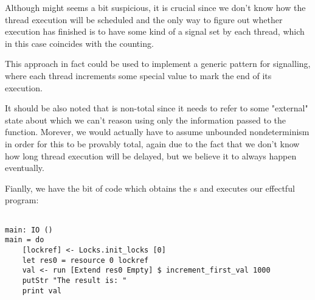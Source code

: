 Although  might seems a bit suspicious, it is crucial
since we don't know how the thread execution will be scheduled and the only way
to figure out whether execution has finished is to have some kind of a signal
set by each thread, which in this case coincides with the counting.

This approach in fact could be used to implement a generic pattern for
signalling, where each thread increments some special value to mark the end of
its execution.

It should be also noted that  is non-total since
it needs to refer to some "external" state about which we can't reason using
only the information passed to the function. Morever, we would actually have to
assume unbounded nondeterminism in order for this to be provably total, again
due to the fact that we don't know how long thread execution will be delayed,
but we believe it to always happen eventually.

Fianlly, we have the bit of code which obtains the s and executes
our effectful program:

\begin{BVerbatim}

main: IO ()
main = do
    [lockref] <- Locks.init_locks [0]
    let res0 = resource 0 lockref
    val <- run [Extend res0 Empty] $ increment_first_val 1000
    putStr "The result is: "
    print val

\end{BVerbatim}

